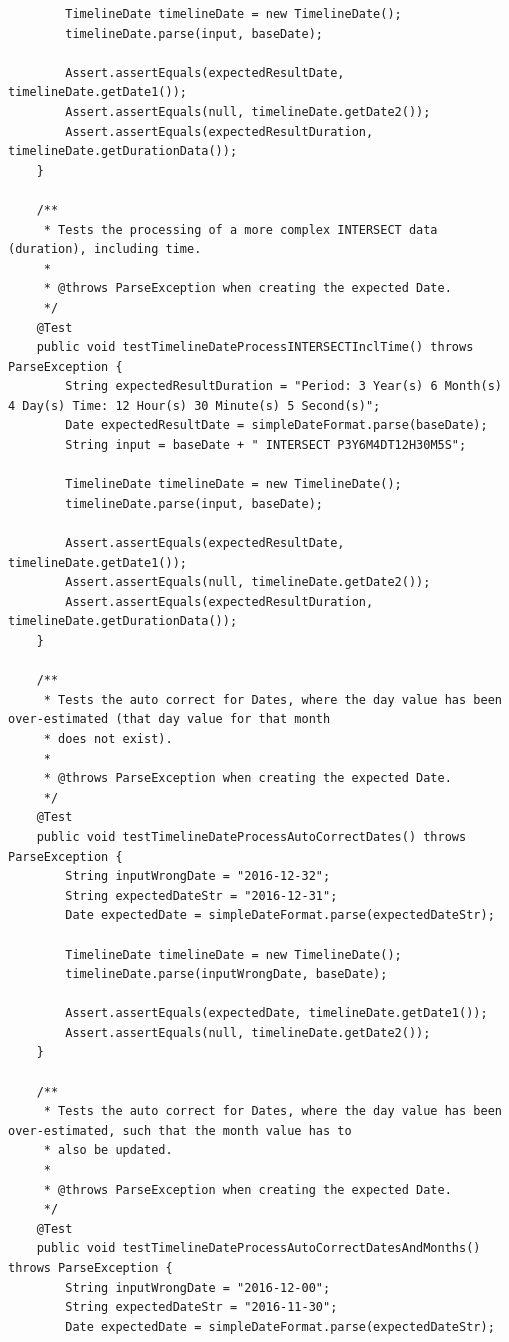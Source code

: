 \begin{lstlisting}
        TimelineDate timelineDate = new TimelineDate();
        timelineDate.parse(input, baseDate);

        Assert.assertEquals(expectedResultDate, timelineDate.getDate1());
        Assert.assertEquals(null, timelineDate.getDate2());
        Assert.assertEquals(expectedResultDuration, timelineDate.getDurationData());
    }

    /**
     * Tests the processing of a more complex INTERSECT data (duration), including time.
     *
     * @throws ParseException when creating the expected Date.
     */
    @Test
    public void testTimelineDateProcessINTERSECTInclTime() throws ParseException {
        String expectedResultDuration = "Period: 3 Year(s) 6 Month(s) 4 Day(s) Time: 12 Hour(s) 30 Minute(s) 5 Second(s)";
        Date expectedResultDate = simpleDateFormat.parse(baseDate);
        String input = baseDate + " INTERSECT P3Y6M4DT12H30M5S";

        TimelineDate timelineDate = new TimelineDate();
        timelineDate.parse(input, baseDate);

        Assert.assertEquals(expectedResultDate, timelineDate.getDate1());
        Assert.assertEquals(null, timelineDate.getDate2());
        Assert.assertEquals(expectedResultDuration, timelineDate.getDurationData());
    }

    /**
     * Tests the auto correct for Dates, where the day value has been over-estimated (that day value for that month
     * does not exist).
     *
     * @throws ParseException when creating the expected Date.
     */
    @Test
    public void testTimelineDateProcessAutoCorrectDates() throws ParseException {
        String inputWrongDate = "2016-12-32";
        String expectedDateStr = "2016-12-31";
        Date expectedDate = simpleDateFormat.parse(expectedDateStr);

        TimelineDate timelineDate = new TimelineDate();
        timelineDate.parse(inputWrongDate, baseDate);

        Assert.assertEquals(expectedDate, timelineDate.getDate1());
        Assert.assertEquals(null, timelineDate.getDate2());
    }

    /**
     * Tests the auto correct for Dates, where the day value has been over-estimated, such that the month value has to
     * also be updated.
     *
     * @throws ParseException when creating the expected Date.
     */
    @Test
    public void testTimelineDateProcessAutoCorrectDatesAndMonths() throws ParseException {
        String inputWrongDate = "2016-12-00";
        String expectedDateStr = "2016-11-30";
        Date expectedDate = simpleDateFormat.parse(expectedDateStr);


\end{lstlisting}
